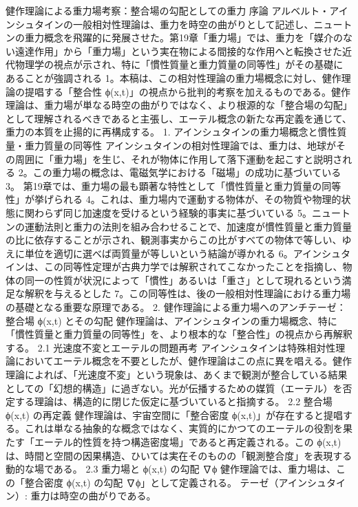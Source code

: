 \documentclass{article}
\begin{document}
健作理論による重力場考察：整合場の勾配としての重力
序論
アルベルト・アインシュタインの一般相対性理論は、重力を時空の曲がりとして記述し、ニュートンの重力概念を飛躍的に発展させた。第19章「重力場」では、重力を「媒介のない遠達作用」から「重力場」という実在物による間接的な作用へと転換させた近代物理学の視点が示され、特に「慣性質量と重力質量の同等性」がその基礎にあることが強調される 1。本稿は、この相対性理論の重力場概念に対し、健作理論の提唱する「整合性 ϕ(x,t)」の視点から批判的考察を加えるものである。健作理論は、重力場が単なる時空の曲がりではなく、より根源的な「整合場の勾配」として理解されるべきであると主張し、エーテル概念の新たな再定義を通じて、重力の本質を止揚的に再構成する。
1. アインシュタインの重力場概念と慣性質量・重力質量の同等性
アインシュタインの相対性理論では、重力は、地球がその周囲に「重力場」を生じ、それが物体に作用して落下運動を起こすと説明される 2。この重力場の概念は、電磁気学における「磁場」の成功に基づいている 3。
第19章では、重力場の最も顕著な特性として「慣性質量と重力質量の同等性」が挙げられる 4。これは、重力場内で運動する物体が、その物質や物理的状態に関わらず同じ加速度を受けるという経験的事実に基づいている 5。ニュートンの運動法則と重力の法則を組み合わせることで、加速度が慣性質量と重力質量の比に依存することが示され、観測事実からこの比がすべての物体で等しい、ゆえに単位を適切に選べば両質量が等しいという結論が導かれる 6。アインシュタインは、この同等性定理が古典力学では解釈されてこなかったことを指摘し、物体の同一の性質が状況によって「慣性」あるいは「重さ」として現れるという満足な解釈を与えるとした 7。この同等性は、後の一般相対性理論における重力場の基礎となる重要な原理である。
2. 健作理論による重力場へのアンチテーゼ：整合場 ϕ(x,t) とその勾配
健作理論は、アインシュタインの重力場概念、特に「慣性質量と重力質量の同等性」を、より根本的な「整合性」の視点から再解釈する。
2.1 光速度不変とエーテルの問題再考
アインシュタインは特殊相対性理論においてエーテル概念を不要としたが、健作理論はこの点に異を唱える。健作理論によれば、「光速度不変」という現象は、あくまで観測が整合している結果としての「幻想的構造」に過ぎない。光が伝播するための媒質（エーテル）を否定する理論は、構造的に閉じた仮定に基づいていると指摘する。
2.2 整合場 ϕ(x,t) の再定義
健作理論は、宇宙空間に「整合密度 ϕ(x,t)」が存在すると提唱する。これは単なる抽象的な概念ではなく、実質的にかつてのエーテルの役割を果たす「エーテル的性質を持つ構造密度場」であると再定義される。この ϕ(x,t) は、時間と空間の因果構造、ひいては実在そのものの「観測整合度」を表現する動的な場である。
2.3 重力場と ϕ(x,t) の勾配 ∇ϕ
健作理論では、重力場は、この「整合密度 ϕ(x,t) の勾配 ∇ϕ」として定義される。
テーゼ（アインシュタイン）: 重力は時空の曲がりである。
\end{document}
